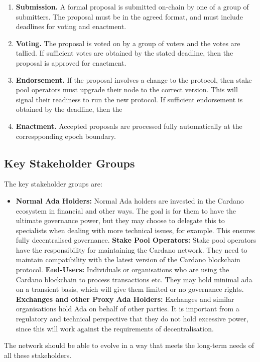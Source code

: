 \begin{enumerate}
\item
  \textbf{Submission.}  A formal proposal is submitted on-chain by one of a group of submitters.  The proposal must be in the agreed format, and must include deadlines for voting and enactment.
\item
  \textbf{Voting.}  The proposal is voted on by a group of voters and the votes are tallied.  If sufficient votes are obtained by the stated deadline, then the proposal is approved for enactment.
\item
  \textbf{Endorsement.}  If the proposal involves a change to the protocol, then stake pool operators must upgrade their node to the correct version.  This will signal their readiness to run the new protocol.
  If sufficient endorsement is obtained by the deadline, then the
\item
  \textbf{Enactment.}  Accepted proposals are processed fully automatically at the correspponding epoch boundary.
\end{enumerate}

\subsection{Key Stakeholder Groups}

The key stakeholder groups are:

\begin{itemize}
\item
  \textbf{Normal Ada Holders:}
  Normal Ada holders are invested in the Cardano ecosystem in financial and other ways.
  The goal is for them to have the ultimate governance power, but they may choose to delegate this to specialists when dealing with more technical issues, for example.
  This ensures fully decentralised governance.
  \textbf{Stake Pool Operators:}
  Stake pool operators have the responsibility for maintaining the Cardano network.  They need to maintain compatibility with the latest version of the Cardano blockchain protocol.
  \textbf{End-Users:}
  Individuals or organisations who are using the Cardano blockchain to process transactions etc.  They may hold minimal ada on a transient basis, which will give them limited or no governance rights.
  \textbf{Exchanges and other Proxy Ada Holders:}
  Exchanges and similar organisations hold Ada on behalf of other parties.  It is important from a regulatory and technical perspective that they do not hold excessive
  power, since this will work against the requirements of decentralisation.
\end{itemize}

The network should be able to evolve in a way that meets the long-term needs of all these stakeholders.
